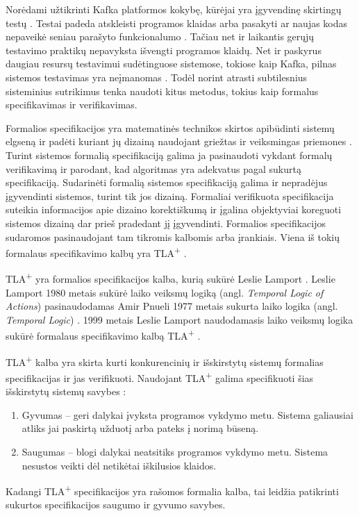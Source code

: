 \documentclass{VUMIFPSmagistrinis}
\begin{document}
		Norėdami užtikrinti Kafka platformos kokybę, kūrėjai yra įgyvendinę skirtingų testų \cite{kfkGH}.
		Testai padeda atskleisti programos klaidas arba pasakyti ar naujas kodas nepaveikė seniau parašyto funkcionalumo \cite{819971}.
		Tačiau net ir laikantis gerųjų testavimo praktikų nepavyksta išvengti programos klaidų.
		Net ir paskyrus daugiau resursų testavimui sudėtinguose sistemose, tokiose kaip Kafka, pilnas sistemos testavimas yra neįmanomas \cite{sullivan2004software}.
		Todėl norint atrasti subtilesnius sisteminius sutrikimus tenka naudoti kitus metodus, tokius kaip formalus specifikavimas ir verifikavimas.


		Formalios specifikacijos yra matematinės technikos skirtos apibūdinti sistemų elgseną ir padėti kuriant jų dizainą naudojant griežtas ir veiksmingas priemones \cite{holzmann1995improvement}.
		Turint sistemos formalią specifikaciją galima ja pasinaudoti vykdant formalų verifikavimą ir parodant, kad algoritmas yra adekvatus pagal sukurtą specifikaciją.
		Sudarinėti formalią sistemos specifikaciją galima ir nepradėjus įgyvendinti sistemos, turint tik jos dizainą. 
		Formaliai verifikuota specifikacija suteikia informacijos apie dizaino korektiškumą ir įgalina objektyviai koreguoti sistemos dizainą dar prieš pradedant jį įgyvendinti.
		Formalios specifikacijos sudaromos pasinaudojant tam tikromis kalbomis arba įrankiais.
		Viena iš tokių formalaus specifikavimo kalbų yra TLA\textsuperscript{+} \cite{lamport2002specifying}.
		

		TLA\textsuperscript{+} yra formalios specifikacijos kalba, kurią sukūrė Leslie Lamport \cite{lamport2002specifying}.
		Leslie Lamport 1980 metais sukūrė laiko veiksmų logiką (angl. {\it Temporal Logic of Actions}) \cite{10.1145/177492.177726} pasinaudodamas Amir Pnueli 1977 metais sukurta laiko logika (angl. {\it Temporal Logic}) \cite{4567924}.
		1999 metais Leslie Lamport naudodamasis laiko veiksmų logika sukūrė formalaus specifikavimo kalbą TLA\textsuperscript{+} \cite{lamport2002specifying}.
		

TLA\textsuperscript{+} kalba yra skirta kurti konkurencinių ir išskirstytų sistemų formalias specifikacijas ir jas verifikuoti.
		Naudojant TLA\textsuperscript{+} galima specifikuoti šias išskirstytų sistemų savybes \cite{lamport2019safety}:
		\begin{enumerate}
			\item{Gyvumas -- geri dalykai įvyksta programos vykdymo metu. Sistema galiausiai atliks jai paskirtą užduotį arba pateks į norimą būseną.}
			\item{Saugumas -- blogi dalykai neatsitiks programos vykdymo metu. Sistema nesustos veikti dėl netikėtai iškilusios klaidos.}
		\end{enumerate}
		Kadangi TLA\textsuperscript{+} specifikacijos yra rašomos formalia kalba, tai leidžia patikrinti sukurtos specifikacijos saugumo ir gyvumo savybes.
		
\end{document}
